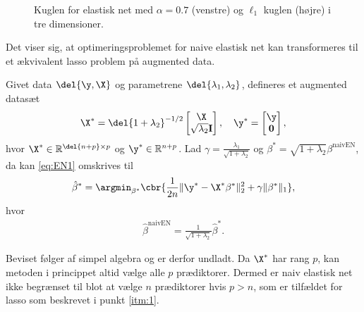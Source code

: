 %
\begin{figure}[H]
\centering
\caption{Kuglen for elastisk net med \(\alpha=0.7\) (venstre) og \(\ell_1\) kuglen (højre) i tre dimensioner.}
\label{fig:elastisk_net}
\end{figure}
%
Det viser sig, at optimeringsproblemet for naive elastisk net kan transformeres til et ækvivalent lasso problem på augmented data.
%
\begin{lem} \label{lem:elastisk_net}
Givet data \(\del{\y, \X}\) og parametrene \(\del{\lambda_1, \lambda_2}\), defineres et augmented datasæt 
\begin{align*}
\X^* = \del{1 + \lambda_2}^{-1/2} \begin{bmatrix}
\X \\ \sqrt{\lambda_2} \mathbf{I}
\end{bmatrix}, \quad \y^* = \begin{bmatrix}
\y \\ \mathbf{0}
\end{bmatrix},
\end{align*}
hvor \(\X^* \in \mathbb{R}^{\del{n+p} \times p}\) og \(\y^* \in \mathbb{R}^{n+p}\).
Lad \(\gamma = \frac{\lambda_1}{\sqrt{1+\lambda_2}}\) og \(\beta^* = \sqrt{1+\lambda_2} \beta^\text{naivEN}\), da kan \eqref{eq:EN1} omskrives til
\begin{align*}
\hat{\beta}^* = \argmin_{\beta^*} \cbr{\frac{1}{2n} \Vert \y^* - \X^* \beta^* \Vert_2^2 +\gamma \Vert \beta^* \Vert_1},
\end{align*}
hvor
\begin{align*}
\hat{\beta}^\text{naivEN} = \frac{1}{\sqrt{1+\lambda_2}} \hat{\beta}^*.
\end{align*}
\end{lem}
%
Beviset følger af simpel algebra og er derfor undladt.
Da \(\X^*\) har rang \(p\), kan metoden i princippet altid vælge alle \(p\) prædiktorer.
Dermed er naiv elastisk net ikke begrænset til blot at vælge \(n\) prædiktorer hvis \(p > n\), som er tilfældet for lasso som beskrevet i punkt \ref{itm:1}.
